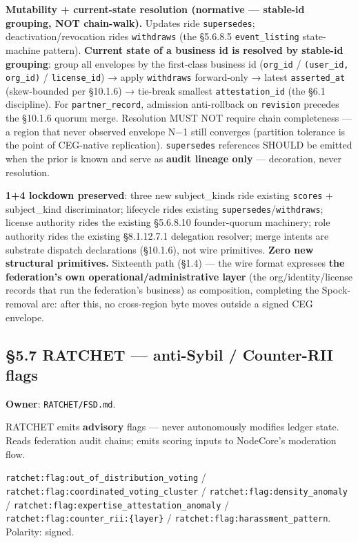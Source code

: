 \documentclass[10pt]{article}
\begin{document}
\textbf{Mutability + current-state resolution (normative — stable-id grouping, NOT chain-walk).} Updates ride \texttt{supersedes}; deactivation/revocation rides \texttt{withdraws} (the §5.6.8.5 \texttt{event\_listing} state-machine pattern). \textbf{Current state of a business id is resolved by stable-id grouping}: group all envelopes by the first-class business id (\texttt{org\_id} / \texttt{(user\_id, org\_id)} / \texttt{license\_id}) → apply \texttt{withdraws} forward-only → latest \texttt{asserted\_at} (skew-bounded per §10.1.6) → tie-break smallest \texttt{attestation\_id} (the §6.1 discipline). For \texttt{partner\_record}, admission anti-rollback on \texttt{revision} precedes the §10.1.6 quorum merge. Resolution MUST NOT require chain completeness — a region that never observed envelope N−1 still converges (partition tolerance is the point of CEG-native replication). \texttt{supersedes} references SHOULD be emitted when the prior is known and serve as \textbf{audit lineage only} — decoration, never resolution.


\textbf{1+4 lockdown preserved}: three new subject\_kinds ride existing \texttt{scores} + subject\_kind discriminator; lifecycle rides existing \texttt{supersedes}/\texttt{withdraws}; license authority rides the existing §5.6.8.10 founder-quorum machinery; role authority rides the existing §8.1.12.7.1 delegation resolver; merge intents are substrate dispatch declarations (§10.1.6), not wire primitives. \textbf{Zero new structural primitives.} Sixteenth path (§1.4) — the wire format expresses \textbf{the federation's own operational/administrative layer} (the org/identity/license records that run the federation's business) as composition, completing the Spock-removal arc: after this, no cross-region byte moves outside a signed CEG envelope.


\subsection*{§5.7 RATCHET — anti-Sybil / Counter-RII flags}


\textbf{Owner}: \texttt{RATCHET/FSD.md}.


RATCHET emits \textbf{advisory} flags — never autonomously modifies ledger state. Reads federation audit chains; emits scoring inputs to NodeCore's moderation flow.


\texttt{ratchet:flag:out\_of\_distribution\_voting} / \texttt{ratchet:flag:coordinated\_voting\_cluster} / \texttt{ratchet:flag:density\_anomaly} / \texttt{ratchet:flag:expertise\_attestation\_anomaly} / \texttt{ratchet:flag:counter\_rii:\{layer\}} / \texttt{ratchet:flag:harassment\_pattern}. Polarity: signed.
\end{document}
